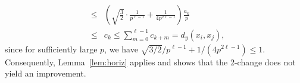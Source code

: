 \documentclass[11pt,DIV=12,a4paper]{scrartcl}
\begin{document}
\begin{enumerate}
\begin{eqnarray*}
& \le & \left(\sqrt{\frac{3}{2}}\cdot \frac{1}{p^{\ell-1}} + \frac{1}{4p^{2\ell-1}}\right)\frac{a_k}{p} \\
& \le & c_k \le \sum_{m=0}^{\ell-1} c_{k+m} = d_y(x_i,x_j),
\end{eqnarray*}
since for sufficiently large $p$, we have $\sqrt{3/2}/p^{\ell-1} + 1/(4p^{2\ell-1})\le 1$. Consequently, Lemma~\ref{lem:horiz} applies and shows that the 2-change does not yield an improvement.
%
\end{enumerate}
\end{document}

